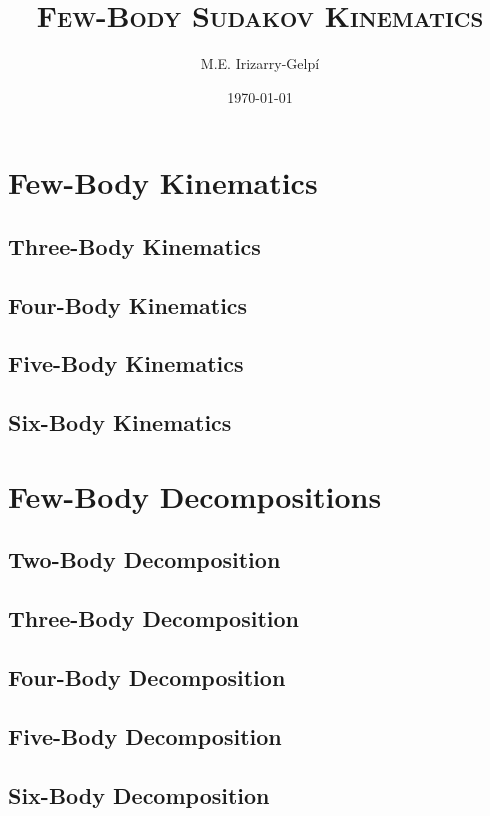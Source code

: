 \documentclass[letterpaper, 12pt]{report}
\begin{document}
\title{\Huge\textsc{Few-Body Sudakov Kinematics}}
\author{M.E. Irizarry-Gelp\'{i}}
\date{\today}

\maketitle
\tableofcontents




\part{Few-Body Kinematics}


\chapter{Three-Body Kinematics}
\chapter{Four-Body Kinematics}
\chapter{Five-Body Kinematics}
\chapter{Six-Body Kinematics}

\part{Few-Body Decompositions}

\chapter{Two-Body Decomposition}
\chapter{Three-Body Decomposition}
\chapter{Four-Body Decomposition}
\chapter{Five-Body Decomposition}
\chapter{Six-Body Decomposition}
\end{document}
